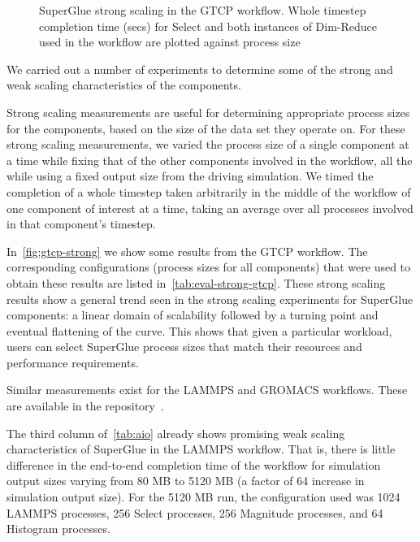 \begin{figure}
  \centering
  
  
  \caption{SuperGlue strong scaling in the GTCP workflow. Whole timestep
    completion time (secs) for Select and both instances of Dim-Reduce used in
    the workflow are plotted against process size}
  \label{fig:gtcp-strong}
  \vspace{-0.25in}
\end{figure}

We carried out a number of experiments
to determine some of the strong and weak scaling
characteristics of the components.

Strong scaling measurements are useful for
determining appropriate process sizes
for the components, based on the size of the
data set they operate on.
For these strong scaling measurements,
we varied the process size of a single component at
a time while fixing that of the
other components involved in the workflow,
all the while using a fixed output size from
the driving simulation.
We timed the completion of a whole timestep
taken arbitrarily in the middle of the workflow
of one component of interest at a time,
taking an average over all processes
involved in that component's timestep.

In~\autoref{fig:gtcp-strong} we show some results 
from the GTCP workflow.
The corresponding configurations (process sizes for all components)
that were used to obtain these results are listed
in~\autoref{tab:eval-strong-gtcp}.
These strong scaling results show a general trend
seen in the strong scaling experiments for SuperGlue
components: a linear domain of scalability followed
by a turning point and eventual flattening
of the curve. This shows
that given
a particular workload, users can select SuperGlue process sizes
that match their resources and performance requirements.

Similar measurements exist for the LAMMPS and GROMACS workflows.
These are available in the repository~\cite{champsaur:superglue-repo}.

The third column of~\autoref{tab:aio} already
shows promising
weak scaling characteristics of SuperGlue
in the LAMMPS workflow. That is, there is little
difference in the end-to-end
completion time of the workflow
for simulation output sizes varying
from 80 MB to 5120 MB (a factor of 64
increase in simulation output size).
For the 5120 MB run, the configuration used
was 1024 LAMMPS processes, 256 Select processes,
256 Magnitude processes, and 64 Histogram processes.

